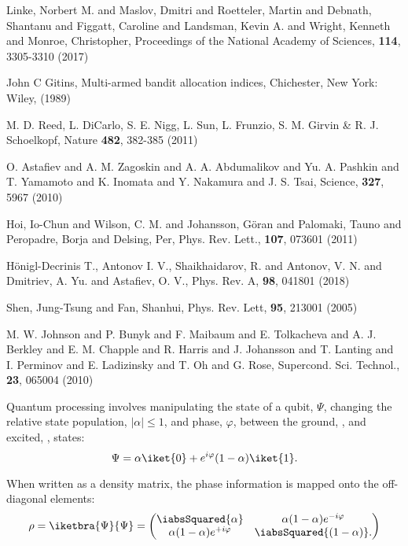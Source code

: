 
\begin{thebibliography}{99}

 Linke, Norbert M. and Maslov, Dmitri and
  Roetteler, Martin and Debnath, Shantanu and Figgatt, Caroline and
  Landsman, Kevin A. and Wright, Kenneth and Monroe, Christopher,
  Proceedings of the National Academy of Sciences, \textbf{114},
  3305-3310 (2017)

 John C Gitins, Multi-armed bandit allocation
  indices, Chichester, New York: Wiley, (1989)
        
 {M. D. Reed, L. DiCarlo, S. E. Nigg, L. Sun,
    L. Frunzio, S. M. Girvin & R. J. Schoelkopf}, Nature \textbf{482},
  382-385 (2011)

 O. Astafiev and A. M. Zagoskin and
  A. A. Abdumalikov and Yu. A. Pashkin and T. Yamamoto and K. Inomata
  and Y. Nakamura and J. S. Tsai, Science, \textbf{327}, 5967 (2010)

 Hoi, Io-Chun and Wilson, C. M. and Johansson,
  G\"oran and Palomaki, Tauno and Peropadre, Borja and Delsing, Per,
  Phys. Rev. Lett., \textbf{107}, 073601 (2011)

 H\"onigl-Decrinis T., Antonov I. V.,
  Shaikhaidarov, R. and Antonov, V. N. and Dmitriev, A. Yu. and
  Astafiev, O. V., Phys. Rev. A, \textbf{98}, 041801 (2018)

 Shen, Jung-Tsung and Fan, Shanhui, Phys. Rev. Lett,
  \textbf{95}, 213001 (2005)

 {M. W. Johnson and P. Bunyk and F. Maibaum and
    E. Tolkacheva and A. J. Berkley and E. M. Chapple and R. Harris
    and J. Johansson and T. Lanting and I. Perminov and E. Ladizinsky
    and T. Oh and G. Rose}, {Supercond. Sci. Technol.}, \textbf{23},
  {065004} (2010)

 Quantum processing involves manipulating the state
  of a qubit, $\Psi$, changing the relative state population,
  $\ensuremath{|\alpha|} \le 1$, and phase, $\varphi$, between the ground,
  , and excited, , states:
  \begin{equation}
    \label{eq:4}
    \Psi = \alpha\iket{0} + e^{i\varphi}(1-\alpha)\iket{1}.
  \end{equation}

  \noindent When written as a density matrix, the phase information is
  mapped onto the off-diagonal elements:
  \begin{equation}
    \label{eq:5}
    \rho = \iketbra{\Psi}{\Psi} = \begin{pmatrix}
      \iabsSquared{\alpha}  & \alpha(1-\alpha)e^{-i\varphi}\\
      \alpha(1-\alpha)e^{+i\varphi} & \iabsSquared{(1-\alpha)}.
    \end{pmatrix}
  \end{equation}


\end{thebibliography}

